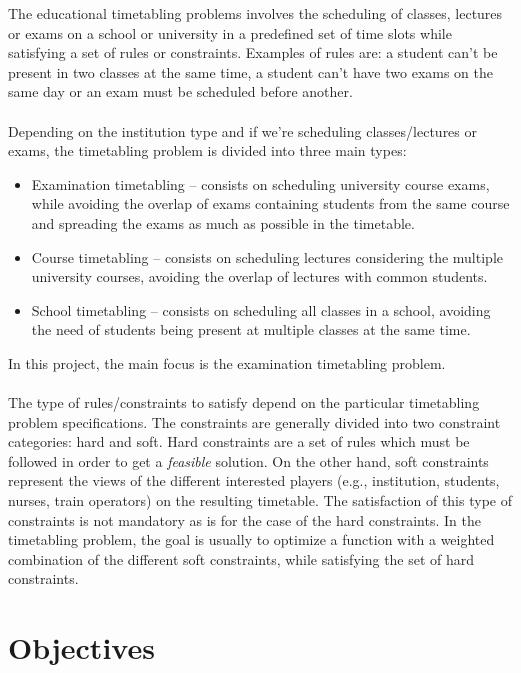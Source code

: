 The educational timetabling problems involves the scheduling of classes, lectures or exams on a school or university in a predefined set of time slots while satisfying a set of rules or constraints. Examples of rules are: a student can't be present in two classes at the same time, a student can't have two exams on the same day or an exam must be scheduled before another.\\
\\
Depending on the institution type and if we're scheduling classes/lectures or exams, the timetabling problem is divided into three main types:\\
\begin{itemize}
	\item Examination timetabling -- consists on scheduling university course exams, while avoiding the overlap of exams containing students from the same course and spreading the exams as much as possible in the timetable.
	\item Course timetabling -- consists on scheduling lectures considering the multiple university courses, avoiding the overlap of lectures with common students.
	\item School timetabling -- consists on scheduling all classes in a school, avoiding the need of students being present at multiple classes at the same time.
\end{itemize}
In this project, the main focus is the examination timetabling problem. \\
\\
The type of rules/constraints to satisfy depend on the particular timetabling problem specifications. The constraints are generally divided into two constraint categories: hard and soft. Hard constraints are a set of rules which must be followed in order to get a \textit{feasible} solution. On the other hand, soft constraints represent the views of the different interested players (e.g., institution, students, nurses, train operators) on the resulting timetable. The satisfaction of this type of constraints is not mandatory as is for the case of the hard constraints. In the timetabling problem, the goal is usually to optimize a function with a weighted combination of the different soft constraints, while satisfying the set of hard constraints. 

\section{Objectives}
\label{sec:Objectives}

